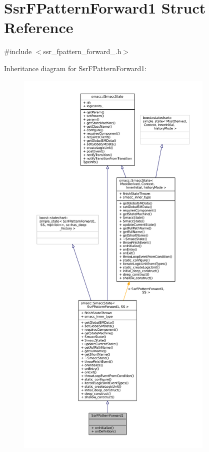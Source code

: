 \hypertarget{structSsrFPatternForward1}{}\section{Ssr\+F\+Pattern\+Forward1 Struct Reference}
\label{structSsrFPatternForward1}


{\ttfamily \#include $<$ssr\+\_\+fpattern\+\_\+forward\+\_.\+h$>$}



Inheritance diagram for Ssr\+F\+Pattern\+Forward1\+:
\nopagebreak
\begin{figure}[H]
\begin{center}
\leavevmode
\includegraphics[height=550pt]{structSsrFPatternForward1__inherit__graph}
\end{center}
\end{figure}


